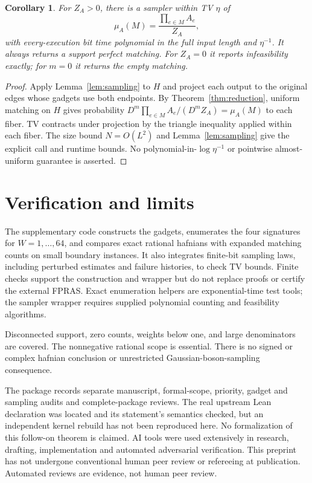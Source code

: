 \documentclass[11pt]{article}
\newtheorem{corollary}[theorem]{Corollary}
\begin{document}
\begin{corollary}\label{cor:weighted-sampling}
For $Z_A>0$, there is a sampler within TV $\eta$ of
\[
 \mu_A(M)=\frac{\prod_{e\in M}A_e}{Z_A},
\]
with every-execution bit time polynomial in the full input length and $\eta^{-1}$. It always returns a support perfect matching. For $Z_A=0$ it reports infeasibility exactly; for $m=0$ it returns the empty matching.
\end{corollary}
\begin{proof}
Apply Lemma~\ref{lem:sampling} to $H$ and project each output to the original edges whose gadgets use both endpoints. By Theorem~\ref{thm:reduction}, uniform matching on $H$ gives probability $D^m\prod_{e\in M}A_e/(D^mZ_A)=\mu_A(M)$ to each fiber. TV contracts under projection by the triangle inequality applied within each fiber. The size bound $N=O(L^2)$ and Lemma~\ref{lem:sampling} give the explicit call and runtime bounds. No polynomial-in-$\log\eta^{-1}$ or pointwise almost-uniform guarantee is asserted.
\end{proof}

\section{Verification and limits}
The supplementary code constructs the gadgets, enumerates the four signatures for $W=1,\ldots,64$, and compares exact rational hafnians with expanded matching counts on small boundary instances. It also integrates finite-bit sampling laws, including perturbed estimates and failure histories, to check TV bounds. Finite checks support the construction and wrapper but do not replace proofs or certify the external FPRAS. Exact enumeration helpers are exponential-time test tools; the sampler wrapper requires supplied polynomial counting and feasibility algorithms.

Disconnected support, zero counts, weights below one, and large denominators are covered. The nonnegative rational scope is essential. There is no signed or complex hafnian conclusion or unrestricted Gaussian-boson-sampling consequence.

The package records separate manuscript, formal-scope, priority, gadget and sampling audits and complete-package reviews. The real upstream Lean declaration was located and its statement's semantics checked, but an independent kernel rebuild has not been reproduced here. No formalization of this follow-on theorem is claimed. AI tools were used extensively in research, drafting, implementation and automated adversarial verification. This preprint has not undergone conventional human peer review or refereeing at publication. Automated reviews are evidence, not human peer review.
\end{document}
